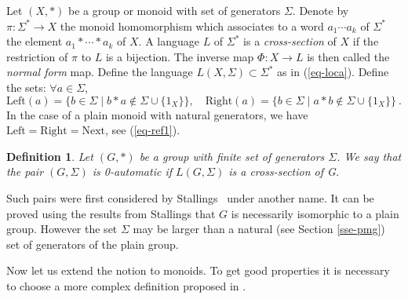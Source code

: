 \documentclass[11pt,a4paper]{article}
\newtheorem{definition}[theorem]{Definition}
\theoremstyle{remark}
\def\rig{\text{Next}}
\def\leftt{\text{Left}}
\def\rightt{\text{Right}}
\def\eref#1{(\ref{#1})}
\begin{document}
Let $(X,\ast)$ be a group or monoid with set of generators
$\Sigma$. Denote by $\pi : \Sigma^{*} \rightarrow X $ the monoid
homomorphism which associates to a word $a_{1}\cdots a_{k}$ of
$\Sigma^*$ the
element $a_{1}\ast \cdots \ast a_{k}$ of $X$. A language $L$ of
$\Sigma^{*}$ is a {\em cross-section} of $X$
if the restriction of $\pi$ to $L$ is a bijection. The inverse map $\Phi:
X \rightarrow L$ is then called the {\em normal form} map.
Define the language $L(X,\Sigma) \subset \Sigma^{*}$ as in 
\eref{eq-loca}. Define the sets: $\forall a \in \Sigma$,
\begin{equation}
\leftt(a) = \bigl\{ b \in \Sigma \mid b \ast a \notin \Sigma \cup
\{1_{X}\}\bigr\}, \quad \rightt(a) = \bigl\{ b \in \Sigma \mid a \ast b
\notin \Sigma \cup \{1_{X}\}\bigr\}\:.
\end{equation}
In the case of a plain monoid with natural generators, we have 
$\leftt=\rightt=\rig$, see \eref{eq-ref1}. 

\begin{definition}\label{de-0autgroup}
Let $(G,\ast)$ be a group with finite set of generators $\Sigma$.
We say that the pair $(G,\Sigma)$ is 0-\textrm{automatic} if
$L(G,\Sigma)$ is a cross-section of G.
\end{definition}

Such pairs were first considered by Stallings~\cite{stal} under
another name. It can be proved using the results from
Stallings that $G$ is necessarily isomorphic to a plain group. 
However the set $\Sigma$ may be larger than a natural (see Section \ref{sse-pmg})
set of generators of the plain group. 

\medskip

Now let us extend the notion to monoids. To get good properties it is
necessary to choose a more complex definition proposed in
\cite{mair04}. 
\end{document}
